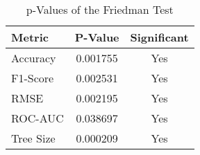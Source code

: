 
    \begin{table}[H]
        \centering
        \renewcommand{\arraystretch}{1.2}
        \caption{p-Values of the Friedman Test}
        \label{tab:RQ_Comparison_friedman}
    \begin{tabular}{lcc}
\toprule
Metric & P-Value & Significant \\
\midrule
Accuracy & 0.001755 & Yes \\
F1-Score & 0.002531 & Yes \\
RMSE & 0.002195 & Yes \\
ROC-AUC & 0.038697 & Yes \\
Tree Size & 0.000209 & Yes \\
\bottomrule
\end{tabular}

        
    \end{table}
    